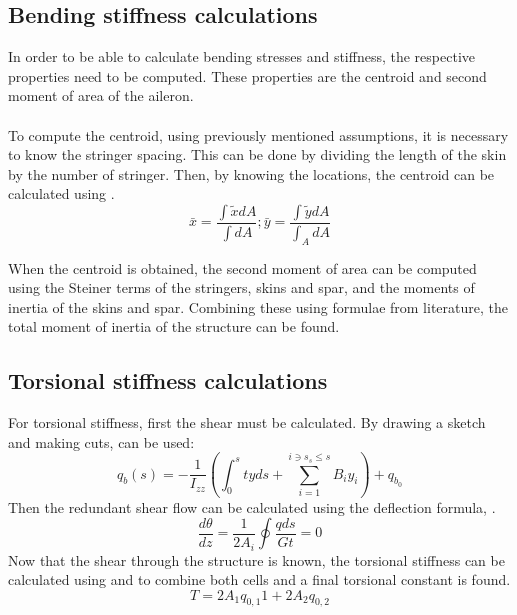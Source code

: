 \subsection{Bending stiffness calculations}
In order to be able to calculate bending stresses and stiffness, the respective properties need to be computed. These properties are the centroid and second moment of area of the aileron. \\ \\
To compute the centroid, using previously mentioned assumptions, it is necessary to know the stringer spacing. This can be done by dividing the length of the skin by the number of stringer. Then, by knowing the locations, the centroid can be calculated using .
\begin{equation}
\label{centroid}
    \bar{x}=\frac{\int \tilde{x} d A}{\int d A} ;  \bar{y}=\frac{\int \tilde{y} d A}{\int_{A} d A}
\end{equation}

\noindent When the centroid is obtained, the second moment of area can be computed using the Steiner terms of the stringers, skins and spar, and the moments of inertia of the skins and spar. Combining these using formulae from literature, the total moment of inertia of the structure can be found.

\subsection{Torsional stiffness calculations}\label{subsec:torsstiffcalc}

For torsional stiffness, first the shear must be calculated. By drawing a sketch and making cuts,  can be used:
\begin{equation}
\label{qb}
    q_{b}(s)=-\frac{1}{I_{z z}}\left(\int_{0}^{s} t y d s+\sum_{i=1}^{i \ni s_{s} \leq s} B_{i} y_{i}\right)+q_{b_{0}}
\end{equation}
\noindent Then the redundant shear flow can be calculated using the deflection formula, . 
\begin{equation}
\label{dtheta}
    \frac{d \theta}{d z}=\frac{1}{2 A_{i}} \oint \frac{q d s}{G t}=0
\end{equation}
Now that the shear through the structure is known, the torsional stiffness can be calculated using  and  to combine both cells and a final torsional constant is found. 
\begin{equation}
\label{T}
    T=2 A_{1} q_{0,1} 1+2 A_{2} q_{0,2}
\end{equation}

